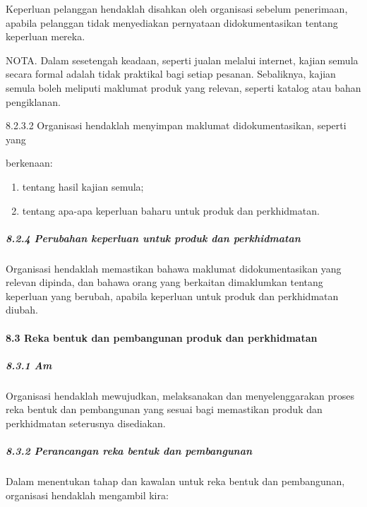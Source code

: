\documentclass[
]{article}
\begin{document}
Keperluan pelanggan hendaklah disahkan oleh organisasi sebelum
penerimaan, apabila pelanggan tidak menyediakan pernyataan
didokumentasikan tentang keperluan mereka.

NOTA. Dalam sesetengah keadaan, seperti jualan melalui internet, kajian
semula secara formal adalah tidak praktikal bagi setiap pesanan.
Sebaliknya, kajian semula boleh meliputi maklumat produk yang relevan,
seperti katalog atau bahan pengiklanan.

8.2.3.2 Organisasi hendaklah menyimpan maklumat didokumentasikan,
seperti yang

berkenaan:

\begin{enumerate}
\def\labelenumi{\alph{enumi})}
\item
  tentang hasil kajian semula;
\item
  tentang apa-apa keperluan baharu untuk produk dan perkhidmatan.
\end{enumerate}

\hypertarget{perubahan-keperluan-untuk-produk-dan-perkhidmatan}{%
\subparagraph{8.2.4 Perubahan keperluan untuk produk dan
perkhidmatan}\label{perubahan-keperluan-untuk-produk-dan-perkhidmatan}}

Organisasi hendaklah memastikan bahawa maklumat didokumentasikan yang
relevan dipinda, dan bahawa orang yang berkaitan dimaklumkan tentang
keperluan yang berubah, apabila keperluan untuk produk dan perkhidmatan
diubah.

\hypertarget{reka-bentuk-dan-pembangunan-produk-dan-perkhidmatan}{%
\paragraph{8.3 Reka bentuk dan pembangunan produk dan
perkhidmatan}\label{reka-bentuk-dan-pembangunan-produk-dan-perkhidmatan}}

\hypertarget{am-5}{%
\subparagraph{8.3.1 Am}\label{am-5}}

Organisasi hendaklah mewujudkan, melaksanakan dan menyelenggarakan
proses reka bentuk dan pembangunan yang sesuai bagi memastikan produk
dan perkhidmatan seterusnya disediakan.

\hypertarget{perancangan-reka-bentuk-dan-pembangunan}{%
\subparagraph{8.3.2 Perancangan reka bentuk dan
pembangunan}\label{perancangan-reka-bentuk-dan-pembangunan}}

Dalam menentukan tahap dan kawalan untuk reka bentuk dan pembangunan,
organisasi hendaklah mengambil kira:
\end{document}
